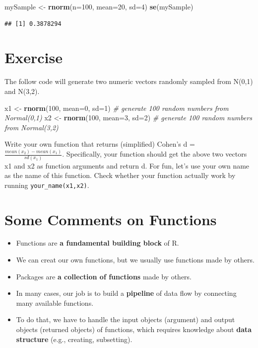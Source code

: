 \documentclass[]{book}
\newenvironment{Shaded}{\begin{snugshade}}{\end{snugshade}}
\newcommand{\KeywordTok}[1]{\textcolor[rgb]{0.13,0.29,0.53}{\textbf{{#1}}}}
\newcommand{\DataTypeTok}[1]{\textcolor[rgb]{0.13,0.29,0.53}{{#1}}}
\newcommand{\DecValTok}[1]{\textcolor[rgb]{0.00,0.00,0.81}{{#1}}}
\newcommand{\StringTok}[1]{\textcolor[rgb]{0.31,0.60,0.02}{{#1}}}
\newcommand{\CommentTok}[1]{\textcolor[rgb]{0.56,0.35,0.01}{\textit{{#1}}}}
\newcommand{\NormalTok}[1]{{#1}}
\providecommand{\tightlist}{%
  \setlength{\itemsep}{0pt}\setlength{\parskip}{0pt}}
\begin{document}
\begin{Shaded}
\begin{Highlighting}[]
\NormalTok{mySample <-}\StringTok{ }\KeywordTok{rnorm}\NormalTok{(}\DataTypeTok{n=}\DecValTok{100}\NormalTok{, }\DataTypeTok{mean=}\DecValTok{20}\NormalTok{, }\DataTypeTok{sd=}\DecValTok{4}\NormalTok{)}
\KeywordTok{se}\NormalTok{(mySample)}
\end{Highlighting}
\end{Shaded}

\begin{verbatim}
## [1] 0.3878294
\end{verbatim}

\section{Exercise}\label{exercise-5}

The follow code will generate two numeric vectors randomly sampled from
N(0,1) and N(3,2).

\begin{Shaded}
\begin{Highlighting}[]
\NormalTok{x1 <-}\StringTok{ }\KeywordTok{rnorm}\NormalTok{(}\DecValTok{100}\NormalTok{, }\DataTypeTok{mean=}\DecValTok{0}\NormalTok{, }\DataTypeTok{sd=}\DecValTok{1}\NormalTok{)  }\CommentTok{# generate 100 random numbers from Normal(0,1)}
\NormalTok{x2 <-}\StringTok{ }\KeywordTok{rnorm}\NormalTok{(}\DecValTok{100}\NormalTok{, }\DataTypeTok{mean=}\DecValTok{3}\NormalTok{, }\DataTypeTok{sd=}\DecValTok{2}\NormalTok{)  }\CommentTok{# generate 100 random numbers from Normal(3,2)}
\end{Highlighting}
\end{Shaded}

Write your own function that returns (simplified) Cohen's d =
\(\frac{mean(x_2)-mean(x_1)}{sd(x_1)}\). Specifically, your function
should get the above two vectors x1 and x2 as function arguments and
return d. For fun, let's use your own name as the name of this function.
Check whether your function actually work by running
\texttt{your\_name(x1,x2)}.

\section{Some Comments on Functions}\label{some-comments-on-functions}

\begin{itemize}
\tightlist
\item
  Functions are \textbf{a fundamental building block} of R.
\item
  We can creat our own functions, but we usually use functions made by
  others.
\item
  Packages are \textbf{a collection of functions} made by others.
\item
  In many cases, our job is to build a \textbf{pipeline} of data flow by
  connecting many available functions.
\item
  To do that, we have to handle the input objects (argument) and output
  objects (returned objects) of functions, which requires knowledge
  about \textbf{data structure} (e.g., creating, subsetting).
\end{itemize}
\end{document}
